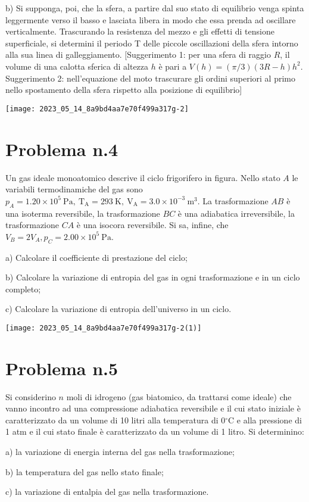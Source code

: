 \documentclass[10pt]{article}
\begin{document}
b) Si supponga, poi, che la sfera, a partire dal suo stato di equilibrio venga spinta leggermente verso il basso e lasciata libera in modo che essa prenda ad oscillare verticalmente. Trascurando la resistenza del mezzo e gli effetti di tensione superficiale, si determini il periodo T delle piccole oscillazioni della sfera intorno alla sua linea di galleggiamento. [Suggerimento 1: per una sfera di raggio \(R\), il volume di una calotta sferica di altezza \(h\) è pari a \(V(h)=(\pi / 3)(3 R-h) h^{2}\). Suggerimento 2: nell'equazione del moto trascurare gli ordini superiori al primo nello spostamento della sfera rispetto alla posizione di equilibrio]

\begin{center}
\texttt{[image: 2023\_05\_14\_8a9bd4aa7e70f499a317g-2]}
\end{center}

\section{Problema n.4}
Un gas ideale monoatomico descrive il ciclo frigorifero in figura. Nello stato \(A\) le variabili termodinamiche del gas sono \(p_{A}=1.20 \times 10^{5} \mathrm{~Pa}, \mathrm{~T}_{\mathrm{A}}=293 \mathrm{~K}, \mathrm{~V}_{\mathrm{A}}=3.0 \times 10^{-3} \mathrm{~m}^{3}\). La trasformazione \(A B\) è una isoterma reversibile, la trasformazione \(B C\) è una adiabatica irreversibile, la trasformazione \(C A\) è una isocora reversibile. Si sa, infine, che \(V_{B}=2 V_{A}, p_{C}=2.00 \times 10^{5} \mathrm{~Pa}\).

a) Calcolare il coefficiente di prestazione del ciclo;

b) Calcolare la variazione di entropia del gas in ogni trasformazione e in un ciclo completo;

c) Calcolare la variazione di entropia dell'universo in un ciclo.

\begin{center}
\texttt{[image: 2023\_05\_14\_8a9bd4aa7e70f499a317g-2(1)]}
\end{center}

\section{Problema n.5}
Si considerino \(n\) moli di idrogeno (gas biatomico, da trattarsi come ideale) che vanno incontro ad una compressione adiabatica reversibile e il cui stato iniziale è caratterizzato da un volume di 10 litri alla temperatura di \(0{ }^{\circ} \mathrm{C}\) e alla pressione di 1 atm e il cui stato finale è caratterizzato da un volume di 1 litro. Si determinino:

a) la variazione di energia interna del gas nella trasformazione;

b) la temperatura del gas nello stato finale;

c) la variazione di entalpia del gas nella trasformazione.
\end{document}
